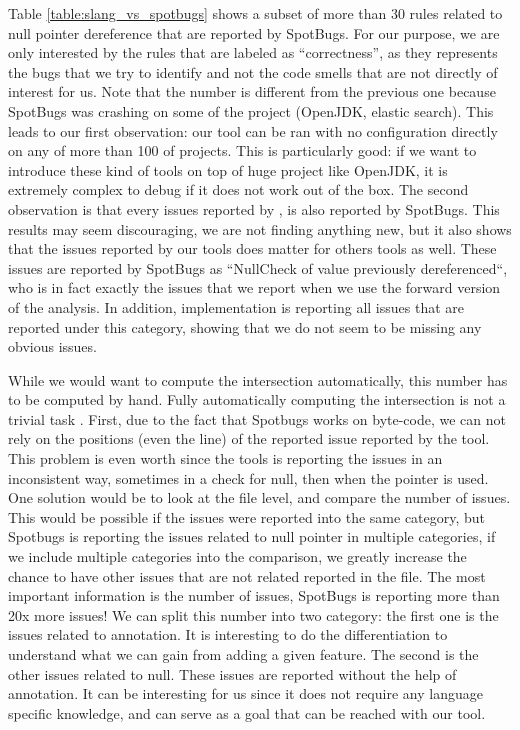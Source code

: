 Table \ref{table:slang_vs_spotbugs} shows a subset of more than 30 rules related to null pointer dereference that are reported by SpotBugs. 
For our purpose, we are only interested by the rules that are labeled as “correctness”, as they represents the bugs that we try to identify and not the code smells that are not directly of interest for us. \newline
Note that the number is different from the previous one because SpotBugs was crashing on some of the project (OpenJDK, elastic search). 
This leads to our first observation: our tool can be ran with no configuration directly on any of more than 100 of projects.
This is particularly good: if we want to introduce these kind of tools on top of huge project like OpenJDK, it is extremely complex to debug if it does not work out of the box. 
The second observation is that every issues reported by \slang, is also reported by SpotBugs. This results may seem discouraging, we are not finding anything new, but it also shows that the issues reported by our tools does matter for others tools as well. 
These issues are reported by SpotBugs as “NullCheck of value previously dereferenced“, who is in fact exactly the issues that we report when we use the forward version of the analysis. 
In addition, \slang implementation is reporting all issues that are reported under this category, showing that we do not seem to be missing any obvious issues. \newline

While we would want to compute the intersection automatically, this number has to be computed by hand. 
Fully automatically computing the intersection is not a trivial task \cite{Gabel:2010:OIE:1806799.1806806}. 
First, due to the fact that Spotbugs works on byte-code, we can not rely on the positions (even the line) of the reported issue reported by the tool. 
This problem is even worth since the tools is reporting the issues in an inconsistent way, sometimes in a check for null, then when the pointer is used. 
One solution would be to look at the file level, and compare the number of issues. 
This would be possible if the issues were reported into the same category, but Spotbugs is reporting the issues related to null pointer in multiple categories, if we include multiple categories into the comparison, we greatly increase the chance to have other issues that are not related reported in the file. \newline
The most important information is the number of issues, SpotBugs is reporting more than 20x more issues! 
We can split this number into two category: the first one is the issues related to annotation. It is interesting to do the differentiation to understand what we can gain from adding a given feature. 
The second is the other issues related to null. 
These issues are reported without the help of annotation. 
It can be interesting for us since it does not require any language specific knowledge, and can serve as a goal that can be reached with our tool.

